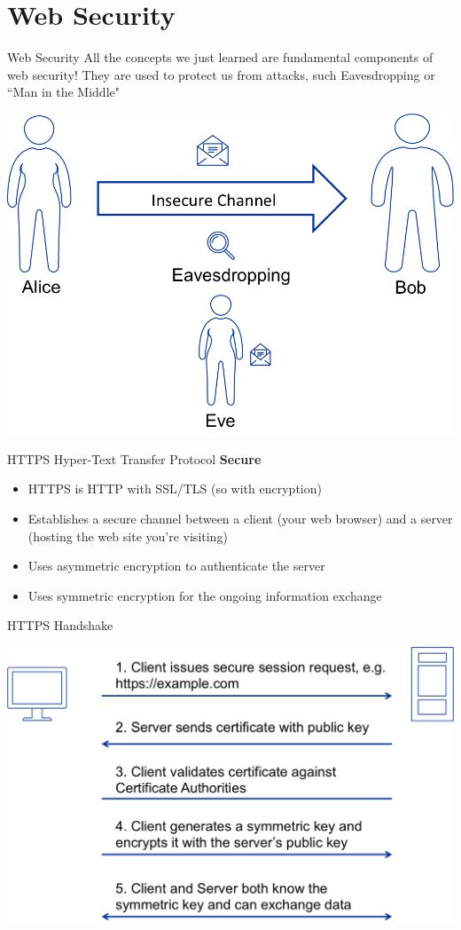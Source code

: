 \documentclass{beamer}
\begin{document}
\section{Web Security}
\frame{\sectionpage}

\begin{frame}{Web Security}
All the concepts we just learned are fundamental components of web security! They are used to protect us from attacks, such Eavesdropping or ``Man in the Middle"
\begin{center}
	\includegraphics[width=0.5\linewidth]{insecure-channel.png}
\end{center}
\end{frame}

\begin{frame}{{\color{red}HTTPS}}
Hyper-Text Transfer Protocol \textbf{Secure} 
\begin{itemize}
\item HTTPS is HTTP with SSL/TLS (so with encryption)
\item Establishes a secure channel between a client (your web browser) and a server (hosting the web site you're visiting) 
\item Uses asymmetric encryption to authenticate the server 
\item Uses symmetric encryption for the ongoing information exchange
\end{itemize}
\end{frame}

\begin{frame}{HTTPS Handshake}
\begin{center}
\includegraphics[width=0.8\linewidth]{https-flow.png} 
\end{center}
\end{frame}
\end{document}
